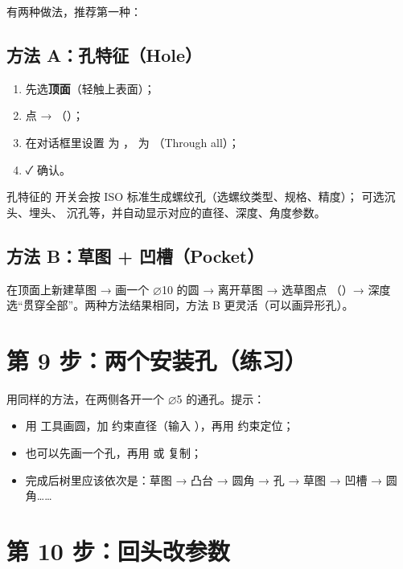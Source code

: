 有两种做法，推荐第一种：

\subsection{方法 A：孔特征（Hole）}

\begin{enumerate}
  \item 先选\textbf{顶面}（轻触上表面）；
  \item 点  → （）；
  \item 在对话框里设置  为 ， 为 （Through all）；
  \item ✓ 确认。
\end{enumerate}

\begin{tip}[标准螺纹与沉头]
孔特征的  开关会按 ISO 标准生成螺纹孔（选螺纹类型、规格、精度）； 可选沉头、埋头、
沉孔等，并自动显示对应的直径、深度、角度参数。
\end{tip}

\subsection{方法 B：草图 + 凹槽（Pocket）}

在顶面上新建草图 → 画一个 ⌀10 的圆 → 离开草图 → 选草图点 （）→
深度选“贯穿全部”。两种方法结果相同，方法 B 更灵活（可以画异形孔）。

\section{第 9 步：两个安装孔（练习）}

用同样的方法，在两侧各开一个 ⌀5 的通孔。提示：
\begin{itemize}
  \item 用  工具画圆，加  约束直径（输入 ），再用  约束定位；
  \item 也可以先画一个孔，再用  或  复制；
  \item 完成后树里应该依次是：草图 → 凸台 → 圆角 → 孔 → 草图 → 凹槽 → 圆角……
\end{itemize}

\section{第 10 步：回头改参数}

